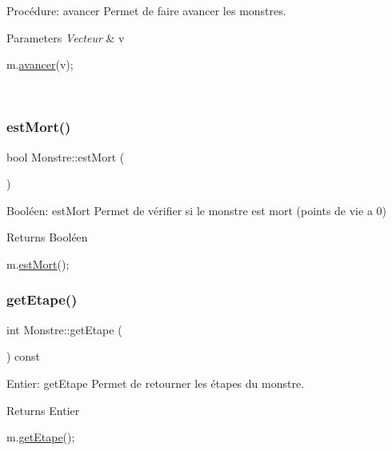 Procédure\+: avancer Permet de faire avancer les monstres. 


\begin{DoxyParams}{Parameters}
{\em Vecteur} & v 
\begin{DoxyCode}
m.\hyperlink{classMonstre_ac8c771a6d9f612716b917688df56905f}{avancer}(v);
\end{DoxyCode}
 \\
\hline
\end{DoxyParams}
\mbox{\label{classMonstre_aebc60bc5dfa1353663ba975c589dc2e3}} 
\subsubsection{\texorpdfstring{est\+Mort()}{estMort()}}
{\footnotesize\ttfamily bool Monstre\+::est\+Mort (\begin{DoxyParamCaption}{ }\end{DoxyParamCaption})}



Booléen\+: est\+Mort Permet de vérifier si le monstre est mort (points de vie a 0) 

\begin{DoxyReturn}{Returns}
Booléen 
\begin{DoxyCode}
m.\hyperlink{classMonstre_aebc60bc5dfa1353663ba975c589dc2e3}{estMort}();
\end{DoxyCode}
 
\end{DoxyReturn}
\mbox{\label{classMonstre_a255b98ed4faab15ecd13a315414a5b94}} 
\subsubsection{\texorpdfstring{get\+Etape()}{getEtape()}}
{\footnotesize\ttfamily int Monstre\+::get\+Etape (\begin{DoxyParamCaption}{ }\end{DoxyParamCaption}) const}



Entier\+: get\+Etape Permet de retourner les étapes du monstre. 

\begin{DoxyReturn}{Returns}
Entier 
\begin{DoxyCode}
m.\hyperlink{classMonstre_a255b98ed4faab15ecd13a315414a5b94}{getEtape}();
\end{DoxyCode}
 
\end{DoxyReturn}
\mbox{\label{classMonstre_a4a71cce5e0825e0e331bfdd3538a9b30}} 
